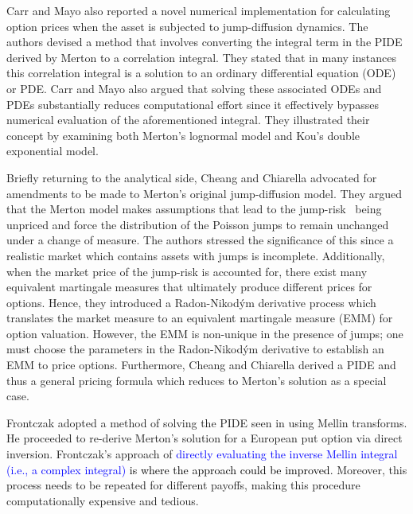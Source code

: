 Carr and Mayo \cite{Carr2007} also reported a novel numerical implementation for calculating option prices when the asset is subjected to jump-diffusion dynamics. The authors devised a method that involves converting the integral term in the PIDE derived by Merton \cite{Merton1976} to a correlation integral. They stated that in many instances this correlation integral is a solution to an ordinary differential equation (ODE) or PDE. Carr and Mayo also argued that solving these associated ODEs and PDEs substantially reduces computational effort since it effectively bypasses numerical evaluation of the aforementioned integral. They illustrated their concept by examining both Merton's lognormal model and Kou's double exponential model.

Briefly returning to the analytical side, Cheang and Chiarella \cite{Cheang2011} advocated for amendments to be made to Merton's original jump-diffusion model. They argued that the Merton model makes assumptions that lead to the jump-risk~\cite{Gibson2001} being unpriced and force the distribution of the Poisson jumps to remain unchanged under a change of measure. The authors stressed the significance of this since a realistic market which contains assets with jumps is incomplete. Additionally, when the market price of the jump-risk is accounted for, there exist many equivalent martingale measures that ultimately produce different prices for options. Hence, they introduced a Radon-Nikod\'{y}m derivative process which translates the market measure to an equivalent martingale measure (EMM) for option valuation. However, the EMM is non-unique in the presence of jumps; one must choose the parameters in the Radon-Nikod\'{y}m derivative to establish an EMM to price options. Furthermore, Cheang and Chiarella derived a PIDE and thus a general pricing formula which reduces to Merton's solution \cite{Merton1976} as a special case.

Frontczak \cite{Frontczak2013} adopted a method of solving the PIDE seen in \cite{Merton1976} using Mellin transforms. He proceeded to re-derive Merton's solution for a European put option via direct inversion. Frontczak's approach of \textcolor{blue}{directly evaluating the inverse Mellin integral (i.e., a complex integral)} \textcolor{black}{is where the approach could be improved}. Moreover, this process needs to be repeated for different payoffs, making this procedure computationally expensive and tedious.
	
	
